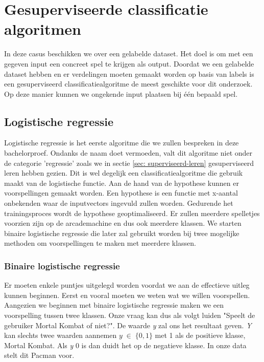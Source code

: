 

\section{Gesuperviseerde classificatie algoritmen}
\label{sec:gesuperviseerde-classificatie-algoritmen}

In deze casus beschikken we over een gelabelde dataset. Het doel is om met een gegeven input een concreet spel te krijgen als output. Doordat we een gelabelde dataset hebben en er verdelingen moeten gemaakt worden op basis van labels is een gesuperviseerd classificatiealgoritme de meest geschikte voor dit onderzoek. Op deze manier kunnen we ongekende input plaatsen bij één bepaald spel.


\subsection{Logistische regressie}
\label{sec:logistische-regressie}

Logistische regressie is het eerste algoritme die we zullen bespreken in deze bachelorproef. Ondanks de naam doet vermoeden, valt dit algoritme niet onder de categorie 'regressie' zoals we in sectie \ref{sec: superviseerd-leren} gesuperviseerd leren hebben gezien. Dit is wel degelijk een classificatiealgoritme die gebruik maakt van de logistische functie. Aan de hand van de hypothese kunnen er voorspellingen gemaakt worden. Een hypothese is een functie met x-aantal onbekenden waar de inputvectors ingevuld zullen worden. Gedurende het trainingsproces wordt de hypothese geoptimaliseerd. Er zullen meerdere spelletjes voorzien zijn op de arcademachine en dus ook meerdere klassen. We starten binaire logistische regressie die later zal gebruikt worden bij twee mogelijke methoden om voorspellingen te maken met meerdere klassen. 

\subsubsection{Binaire logistische regressie}
\label{sec:Binaire-logistische-regressie}

Er moeten enkele puntjes uitgelegd worden voordat we aan de effectieve uitleg kunnen beginnen. Eerst en vooral moeten we weten wat we willen voorspellen. Aangezien we beginnen met binaire logistische regressie maken we een voorspelling tussen twee klassen. Onze vraag kan dus als volgt luiden "Speelt de gebruiker Mortal Kombat of niet?". De waarde \textit{y} zal ons het resultaat geven. \textit{Y} kan slechts twee waarden aannemen $y \; \in \; \{0,1\}$ met 1 als de positieve klasse, Mortal Kombat. Als \textit{y} 0 is dan duidt het op de negatieve klasse. In onze data stelt dit Pacman voor. 

